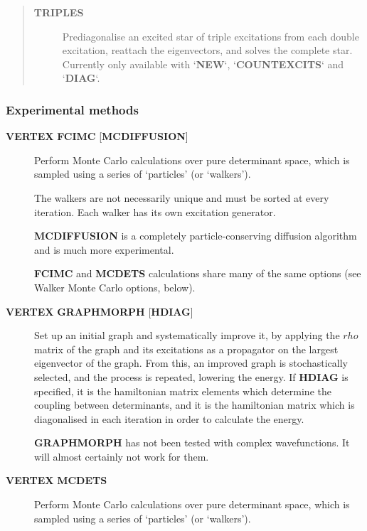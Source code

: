 \documentclass[openany,a4paper,10pt]{manual}
\begin{document}
\begin{description}
\begin{quote}
\begin{description}
\item[\textbf{TRIPLES}]
Prediagonalise an excited star of triple excitations from each
double excitation, reattach the eigenvectors, and solves
the complete star. Currently only available with `\textbf{NEW}`,
`\textbf{COUNTEXCITS}` and `\textbf{DIAG}`.

\end{description}
\end{quote}

\end{description}


\subsubsection{Experimental methods}
\begin{description}
\item[\textbf{VERTEX} \textbf{FCIMC} {[}\textbf{MCDIFFUSION}{]}]
Perform Monte Carlo calculations over pure determinant space, which
is sampled using a series of `particles' (or `walkers').

The walkers are not necessarily unique and must be sorted at every
iteration.  Each walker has its own excitation generator.

\textbf{MCDIFFUSION} is a completely particle-conserving diffusion
algorithm and is much more experimental.

\textbf{FCIMC} and \textbf{MCDETS} calculations share many of the same options
(see Walker Monte Carlo options, below).

\item[\textbf{VERTEX} \textbf{GRAPHMORPH} {[}\textbf{HDIAG}{]}]
Set up an initial graph and systematically improve it, by applying the
$rho$ matrix of the graph and its excitations as a propagator
on the largest eigenvector of the graph. From this, an improved graph
is stochastically selected, and the process is repeated, lowering
the energy. If \textbf{HDIAG} is specified, it is the hamiltonian matrix
elements which determine the coupling between determinants, and it
is the hamiltonian matrix which is diagonalised in each iteration
in order to calculate the energy.

\begin{notice}[note]
\textbf{GRAPHMORPH} has not been tested with complex wavefunctions.  It will
almost certainly not work for them.
\end{notice}

\item[\textbf{VERTEX} \textbf{MCDETS}]
Perform Monte Carlo calculations over pure determinant space, which
is sampled using a series of `particles' (or `walkers').


\end{description}
\end{document}
